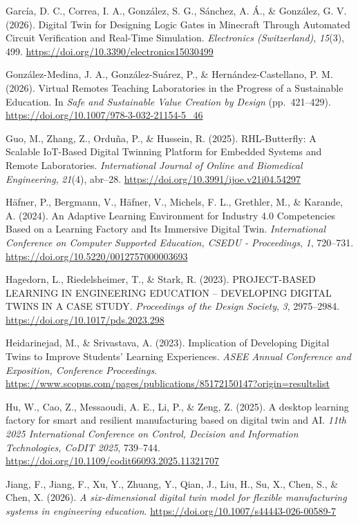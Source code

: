 García, D. C., Correa, I. A., González, S. G., Sánchez, A. Á., \&
González, G. V. (2026). Digital Twin for Designing Logic Gates in
Minecraft Through Automated Circuit Verification and Real-Time
Simulation. \emph{Electronics (Switzerland)}, \emph{15}(3), 499.
\url{https://doi.org/10.3390/electronics15030499}

González-Medina, J. A., González-Suárez, P., \& Hernández-Castellano, P.
M. (2026). Virtual Remotes Teaching Laboratories in the Progress of a
Sustainable Education. In \emph{Safe and Sustainable Value Creation by
Design} (pp.~421--429). \url{https://doi.org/10.1007/978-3-032-21154-5_46}

Guo, M., Zhang, Z., Orduña, P., \& Hussein, R. (2025). RHL-Butterfly: A
Scalable IoT-Based Digital Twinning Platform for Embedded Systems and
Remote Laboratories. \emph{International Journal of Online and Biomedical
Engineering}, \emph{21}(4), abr--28.
\url{https://doi.org/10.3991/ijoe.v21i04.54297}

Häfner, P., Bergmann, V., Häfner, V., Michels, F. L., Grethler, M., \&
Karande, A. (2024). An Adaptive Learning Environment for Industry 4.0
Competencies Based on a Learning Factory and Its Immersive Digital Twin.
\emph{International Conference on Computer Supported Education, CSEDU -
Proceedings}, \emph{1}, 720--731. \url{https://doi.org/10.5220/0012757000003693}

Hagedorn, L., Riedelsheimer, T., \& Stark, R. (2023). PROJECT-BASED
LEARNING IN ENGINEERING EDUCATION -- DEVELOPING DIGITAL TWINS IN A CASE
STUDY. \emph{Proceedings of the Design Society}, \emph{3}, 2975--2984.
\url{https://doi.org/10.1017/pds.2023.298}

Heidarinejad, M., \& Srivastava, A. (2023). Implication of Developing
Digital Twins to Improve Students' Learning Experiences. \emph{ASEE Annual
Conference and Exposition, Conference Proceedings}.
\url{https://www.scopus.com/pages/publications/85172150147?origin=resultslist}

Hu, W., Cao, Z., Messaoudi, A. E., Li, P., \& Zeng, Z. (2025). A desktop
learning factory for smart and resilient manufacturing based on digital
twin and AI. \emph{11th 2025 International Conference on Control, Decision
and Information Technologies, CoDIT 2025}, 739--744.
\url{https://doi.org/10.1109/codit66093.2025.11321707}

Jiang, F., Jiang, F., Xu, Y., Zhuang, Y., Qian, J., Liu, H., Su, X.,
Chen, S., \& Chen, X. (2026). \emph{A six-dimensional digital twin model for
flexible manufacturing systems in engineering education}.
\url{https://doi.org/10.1007/s44443-026-00589-7}

